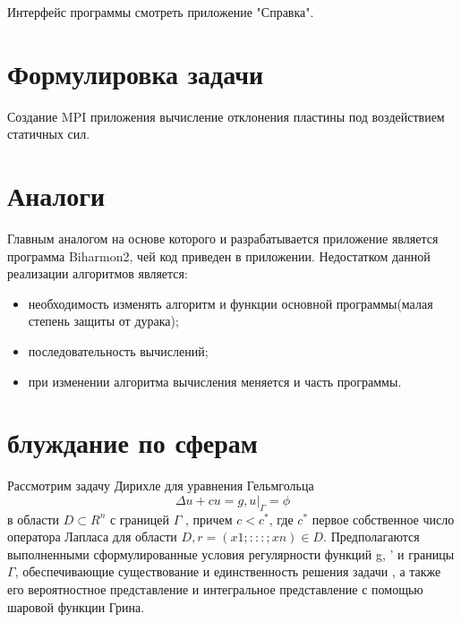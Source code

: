Интерфейс программы смотреть приложение "Справка".

\section{Формулировка задачи}
Создание MPI приложения вычисление отклонения пластины под воздействием статичных сил.
\section{Аналоги}
Главным аналогом на основе которого и разрабатывается приложение является программа Biharmon2, чей код приведен в приложении. Недостатком данной реализации алгоритмов является:
\begin{itemize}
	\item необходимость изменять алгоритм и функции основной программы(малая степень защиты от дурака);
	\item последовательность вычислений;
	\item при изменении алгоритма вычисления меняется и часть программы.
\end{itemize}
\section{блуждание по сферам}
Рассмотрим задачу Дирихле для уравнения Гельмгольца
\[ \Delta u + cu = g,	 u|_{\Gamma} = \phi \]
в области $D \subset R^{n}$ с границей $\Gamma$ , причем $c < c^{*}$, где $c^{*}$ первое собственное число оператора Лапласа для области $D, r = (x1; : : : ; xn) \in D$. Предполагаются выполненными сформулированные условия регулярности функций g, ' и границы $\Gamma$, обеспечивающие существование и единственность решения задачи , а также его вероятностное представление и интегральное представление с помощью шаровой функции Грина.

